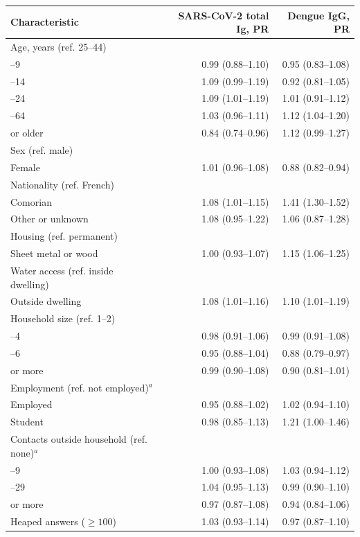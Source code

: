 \begin{tabular}{lrr}
\toprule
Characteristic & SARS-CoV-2 total Ig, PR & Dengue IgG, PR \\
\midrule
Age, years (ref. 25--44) &  &  \\
\quad 6--9 & 0.99 (0.88--1.10) & 0.95 (0.83--1.08) \\
\quad 10--14 & 1.09 (0.99--1.19) & 0.92 (0.81--1.05) \\
\quad 15--24 & 1.09 (1.01--1.19) & 1.01 (0.91--1.12) \\
\quad 45--64 & 1.03 (0.96--1.11) & 1.12 (1.04--1.20) \\
\quad 65 or older & 0.84 (0.74--0.96) & 1.12 (0.99--1.27) \\
\addlinespace
Sex (ref. male) &  &  \\
\quad Female & 1.01 (0.96--1.08) & 0.88 (0.82--0.94) \\
\addlinespace
Nationality (ref. French) &  &  \\
\quad Comorian & 1.08 (1.01--1.15) & 1.41 (1.30--1.52) \\
\quad Other or unknown & 1.08 (0.95--1.22) & 1.06 (0.87--1.28) \\
\addlinespace
Housing (ref. permanent) &  &  \\
\quad Sheet metal or wood & 1.00 (0.93--1.07) & 1.15 (1.06--1.25) \\
\addlinespace
Water access (ref. inside dwelling) &  &  \\
\quad Outside dwelling & 1.08 (1.01--1.16) & 1.10 (1.01--1.19) \\
\addlinespace
Household size (ref. 1--2) &  &  \\
\quad 3--4 & 0.98 (0.91--1.06) & 0.99 (0.91--1.08) \\
\quad 5--6 & 0.95 (0.88--1.04) & 0.88 (0.79--0.97) \\
\quad 7 or more & 0.99 (0.90--1.08) & 0.90 (0.81--1.01) \\
\addlinespace
Employment (ref. not employed)$^{a}$ &  &  \\
\quad Employed & 0.95 (0.88--1.02) & 1.02 (0.94--1.10) \\
\quad Student & 0.98 (0.85--1.13) & 1.21 (1.00--1.46) \\
\addlinespace
Contacts outside household (ref. none)$^{a}$ &  &  \\
\quad 1--9 & 1.00 (0.93--1.08) & 1.03 (0.94--1.12) \\
\quad 10--29 & 1.04 (0.95--1.13) & 0.99 (0.90--1.10) \\
\quad 30 or more & 0.97 (0.87--1.08) & 0.94 (0.84--1.06) \\
\quad Heaped answers ($\geq 100$) & 1.03 (0.93--1.14) & 0.97 (0.87--1.10) \\
\bottomrule
\end{tabular}
